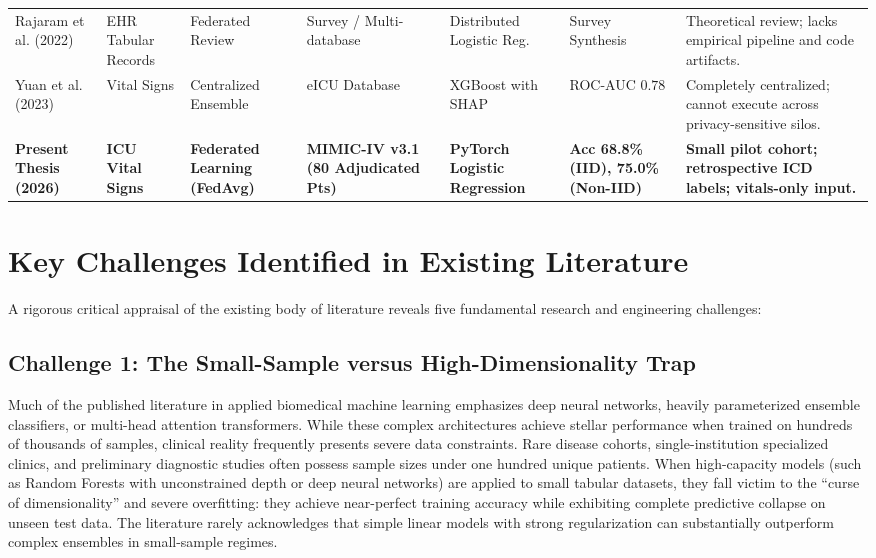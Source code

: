 \documentclass[12pt,a4paper,oneside]{report}
\begin{document}
\begin{table}[htbp]
{\begin{tabular}{@{}llllll>{\raggedright\arraybackslash}p{4.5cm}@{}}
Rajaram et al. (2022) \citep{rajaram2022privacy} & EHR Tabular Records & Federated Review & Survey / Multi-database & Distributed Logistic Reg. & Survey Synthesis & Theoretical review; lacks empirical pipeline and code artifacts. \\ \addlinespace
Yuan et al. (2023) & Vital Signs & Centralized Ensemble & eICU Database & XGBoost with SHAP & ROC-AUC $0.78$ & Completely centralized; cannot execute across privacy-sensitive silos. \\ \addlinespace
\textbf{Present Thesis (2026)} & \textbf{ICU Vital Signs} & \textbf{Federated Learning (FedAvg)} & \textbf{MIMIC-IV v3.1 (80 Adjudicated Pts)} & \textbf{PyTorch Logistic Regression} & \textbf{Acc 68.8\% (IID), 75.0\% (Non-IID)} & \textbf{Small pilot cohort; retrospective ICD labels; vitals-only input.} \\ \bottomrule
\end{tabular}%
}
\end{table}

\section{Key Challenges Identified in Existing Literature}
\label{sec:challenges_identified}

A rigorous critical appraisal of the existing body of literature reveals five fundamental research and engineering challenges:

\subsection{Challenge 1: The Small-Sample versus High-Dimensionality Trap}
Much of the published literature in applied biomedical machine learning emphasizes deep neural networks, heavily parameterized ensemble classifiers, or multi-head attention transformers. While these complex architectures achieve stellar performance when trained on hundreds of thousands of samples, clinical reality frequently presents severe data constraints. Rare disease cohorts, single-institution specialized clinics, and preliminary diagnostic studies often possess sample sizes under one hundred unique patients. When high-capacity models (such as Random Forests with unconstrained depth or deep neural networks) are applied to small tabular datasets, they fall victim to the ``curse of dimensionality'' and severe overfitting: they achieve near-perfect training accuracy while exhibiting complete predictive collapse on unseen test data. The literature rarely acknowledges that simple linear models with strong regularization can substantially outperform complex ensembles in small-sample regimes.
\end{document}
